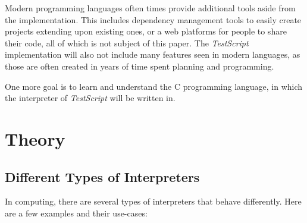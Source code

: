 \documentclass[12pt,a4paper]{article}
\newcommand{\name}{\emph{TestScript}}
\begin{document}
Modern programming languages often times provide additional tools aside from
the implementation. This includes dependency management tools to
easily create projects extending upon existing ones, or a web platforms for
people to share their code, all of which is not subject of this paper.
The \name{} implementation will also not include many features seen in modern
languages, as those are often created in years of time spent planning and
programming.

One more goal is to learn and understand the C programming language, in which
the interpreter of \name{} will be written in.

\section{Theory}
\subsection{Different Types of Interpreters}
In computing, there are several types of interpreters that behave differently.
Here are a few examples and their use-cases:
\end{document}
